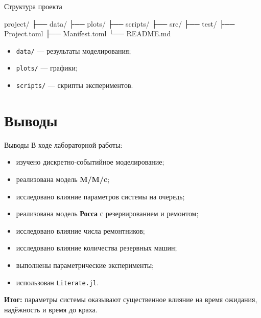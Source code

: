 \documentclass[
  ignorenonframetext,
  aspectratio=169,
  russian,
]{beamer}
\newenvironment{Shaded}{\begin{snugshade}}{\end{snugshade}}
\newcommand{\NormalTok}[1]{\textcolor[rgb]{0.00,0.23,0.31}{#1}}
\providecommand{\tightlist}{%
  \setlength{\itemsep}{0pt}\setlength{\parskip}{0pt}}
\begin{document}
\begin{frame}[fragile]{Структура проекта}
\begin{Shaded}
\begin{Highlighting}[]
\NormalTok{project/}
\NormalTok{├── data/}
\NormalTok{├── plots/}
\NormalTok{├── scripts/}
\NormalTok{├── src/}
\NormalTok{├── test/}
\NormalTok{├── Project.toml}
\NormalTok{├── Manifest.toml}
\NormalTok{└── README.md}
\end{Highlighting}
\end{Shaded}

\begin{itemize}[<+->]
\tightlist
\item
  \texttt{data/} --- результаты моделирования;
\item
  \texttt{plots/} --- графики;
\item
  \texttt{scripts/} --- скрипты экспериментов.
\end{itemize}
\end{frame}

\section{Выводы}\label{ux432ux44bux432ux43eux434ux44b}

\begin{frame}[fragile]{Выводы}
В ходе лабораторной работы:

\begin{itemize}[<+->]
\tightlist
\item
  изучено дискретно-событийное моделирование;
\item
  реализована модель \textbf{M/M/c};
\item
  исследовано влияние параметров системы на очередь;
\item
  реализована модель \textbf{Росса} с резервированием и ремонтом;
\item
  исследовано влияние числа ремонтников;
\item
  исследовано влияние количества резервных машин;
\item
  выполнены параметрические эксперименты;
\item
  использован \texttt{Literate.jl}.
\end{itemize}

\textbf{Итог:} параметры системы оказывают существенное влияние на время
ожидания, надёжность и время до краха.
\end{frame}
\end{document}
